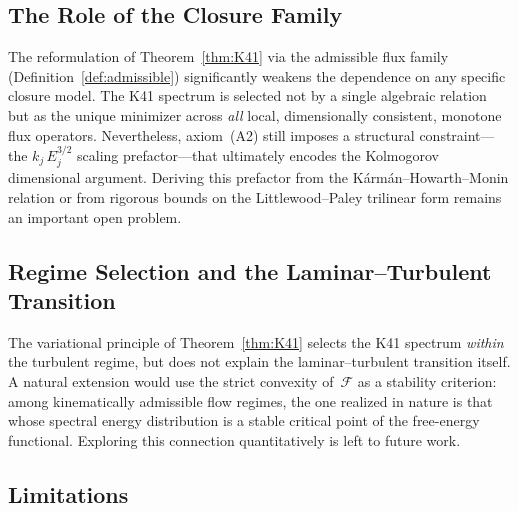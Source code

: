 \documentclass[12pt,a4paper]{article}
\theoremstyle{breakdef}
\theoremstyle{breakplain}
\theoremstyle{breakdef}
\begin{document}
\subsection{The Role of the Closure Family}

The reformulation of Theorem~\ref{thm:K41} via the admissible flux
family (Definition~\ref{def:admissible}) significantly weakens the
dependence on any specific closure model.  The K41 spectrum is selected
not by a single algebraic relation but as the unique minimizer across
\emph{all} local, dimensionally consistent, monotone flux operators.
Nevertheless, axiom~(A2) still imposes a structural constraint---the
$k_j\,E_j^{3/2}$ scaling prefactor---that ultimately encodes the
Kolmogorov dimensional argument.  Deriving this prefactor from the
Kármán--Howarth--Monin relation or from rigorous bounds on the
Littlewood--Paley trilinear form remains an important open problem.

\subsection{Regime Selection and the Laminar--Turbulent Transition}

The variational principle of Theorem~\ref{thm:K41} selects the K41
spectrum \emph{within} the turbulent regime, but does not explain the
laminar--turbulent transition itself.  A natural extension would use the
strict convexity of~$\mathcal{F}$ as a stability criterion: among
kinematically admissible flow regimes, the one realized in nature is
that whose spectral energy distribution is a stable critical point of
the free-energy functional.  Exploring this connection quantitatively
is left to future work.

\subsection{Limitations}
\end{document}
